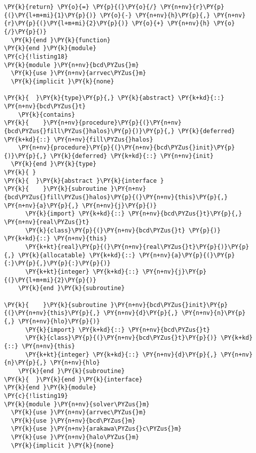 \begin{Verbatim}[commandchars=\\\{\}]
    \PY{k}{return} \PY{o}{=} \PY{p}{(}\PY{o}{/} \PY{n+nv}{r}\PY{p}{(}\PY{l+m+mi}{1}\PY{p}{)} \PY{o}{-} \PY{n+nv}{h}\PY{p}{,} \PY{n+nv}{r}\PY{p}{(}\PY{l+m+mi}{2}\PY{p}{)} \PY{o}{+} \PY{n+nv}{h} \PY{o}{/}\PY{p}{)}
  \PY{k}{end }\PY{k}{function}
\PY{k}{end }\PY{k}{module}
\PY{c}{!listing18}
\PY{k}{module }\PY{n+nv}{bcd\PYZus{}m}
  \PY{k}{use }\PY{n+nv}{arrvec\PYZus{}m}
  \PY{k}{implicit }\PY{k}{none}

\PY{k}{  }\PY{k}{type}\PY{p}{,} \PY{k}{abstract} \PY{k+kd}{::} \PY{n+nv}{bcd\PYZus{}t}
    \PY{k}{contains}
\PY{k}{    }\PY{n+nv}{procedure}\PY{p}{(}\PY{n+nv}{bcd\PYZus{}fill\PYZus{}halos}\PY{p}{)}\PY{p}{,} \PY{k}{deferred} \PY{k+kd}{::} \PY{n+nv}{fill\PYZus{}halos}
    \PY{n+nv}{procedure}\PY{p}{(}\PY{n+nv}{bcd\PYZus{}init}\PY{p}{)}\PY{p}{,} \PY{k}{deferred} \PY{k+kd}{::} \PY{n+nv}{init}
  \PY{k}{end }\PY{k}{type}
\PY{k}{ }
\PY{k}{  }\PY{k}{abstract }\PY{k}{interface }
\PY{k}{    }\PY{k}{subroutine }\PY{n+nv}{bcd\PYZus{}fill\PYZus{}halos}\PY{p}{(}\PY{n+nv}{this}\PY{p}{,} \PY{n+nv}{a}\PY{p}{,} \PY{n+nv}{j}\PY{p}{)}
      \PY{k}{import} \PY{k+kd}{::} \PY{n+nv}{bcd\PYZus{}t}\PY{p}{,} \PY{n+nv}{real\PYZus{}t}
      \PY{k}{class}\PY{p}{(}\PY{n+nv}{bcd\PYZus{}t} \PY{p}{)} \PY{k+kd}{::} \PY{n+nv}{this}
      \PY{k+kt}{real}\PY{p}{(}\PY{n+nv}{real\PYZus{}t}\PY{p}{)}\PY{p}{,} \PY{k}{allocatable} \PY{k+kd}{::} \PY{n+nv}{a}\PY{p}{(}\PY{p}{:}\PY{p}{,}\PY{p}{:}\PY{p}{)} 
      \PY{k+kt}{integer} \PY{k+kd}{::} \PY{n+nv}{j}\PY{p}{(}\PY{l+m+mi}{2}\PY{p}{)}
    \PY{k}{end }\PY{k}{subroutine}

\PY{k}{    }\PY{k}{subroutine }\PY{n+nv}{bcd\PYZus{}init}\PY{p}{(}\PY{n+nv}{this}\PY{p}{,} \PY{n+nv}{d}\PY{p}{,} \PY{n+nv}{n}\PY{p}{,} \PY{n+nv}{hlo}\PY{p}{)}
      \PY{k}{import} \PY{k+kd}{::} \PY{n+nv}{bcd\PYZus{}t}
      \PY{k}{class}\PY{p}{(}\PY{n+nv}{bcd\PYZus{}t}\PY{p}{)} \PY{k+kd}{::} \PY{n+nv}{this}
      \PY{k+kt}{integer} \PY{k+kd}{::} \PY{n+nv}{d}\PY{p}{,} \PY{n+nv}{n}\PY{p}{,} \PY{n+nv}{hlo}
    \PY{k}{end }\PY{k}{subroutine}
\PY{k}{  }\PY{k}{end }\PY{k}{interface}
\PY{k}{end }\PY{k}{module}
\PY{c}{!listing19}
\PY{k}{module }\PY{n+nv}{solver\PYZus{}m}
  \PY{k}{use }\PY{n+nv}{arrvec\PYZus{}m}
  \PY{k}{use }\PY{n+nv}{bcd\PYZus{}m}
  \PY{k}{use }\PY{n+nv}{arakawa\PYZus{}c\PYZus{}m}
  \PY{k}{use }\PY{n+nv}{halo\PYZus{}m}
  \PY{k}{implicit }\PY{k}{none}


\end{Verbatim}
